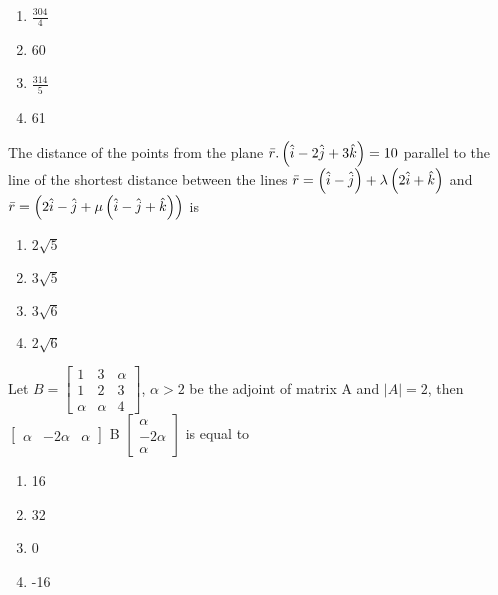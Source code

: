 \hfill{}
\begin{enumerate}
    \item $\frac{304}{4}$
    \item 60
    \item $\frac{314}{5}$
    \item 61
\end{enumerate}
\item The distance of the points  from the plane $\bar{r}.\left(\hat{i}-2\hat{j}+3\hat{k}\right)=10$ parallel to the line of the shortest distance between the lines $\bar{r}=\left(\hat{i}-\hat{j}\right)+\lambda \left(2\hat{i}+\hat{k}\right)$ and $\bar{r}=\left(2\hat{i}-\hat{j}+\mu \left(\hat{i}-\hat{j}+\hat{k}\right)\right)$ is
\hfill{}
\begin{enumerate}
    \item $2\sqrt{5}$
    \item $3\sqrt{5}$
    \item $3\sqrt{6}$
    \item $2\sqrt{6}$
\end{enumerate}
\item Let $B = 
\begin{bmatrix}
1 & 3 & \alpha \\
1 & 2 & 3 \\
\alpha & \alpha & 4
\end{bmatrix}$, $\alpha>2$ be the adjoint of matrix A and $|A|=2$, then $\begin{bmatrix}
    \alpha & -2\alpha & \alpha 
    \end{bmatrix}$ B 
    $\begin{bmatrix}
        \alpha\\
        -2\alpha\\
        \alpha
    \end{bmatrix}$ is equal to
\hfill{}
\begin{enumerate}
    \item 16
    \item 32
    \item 0
    \item -16
\end{enumerate}\
